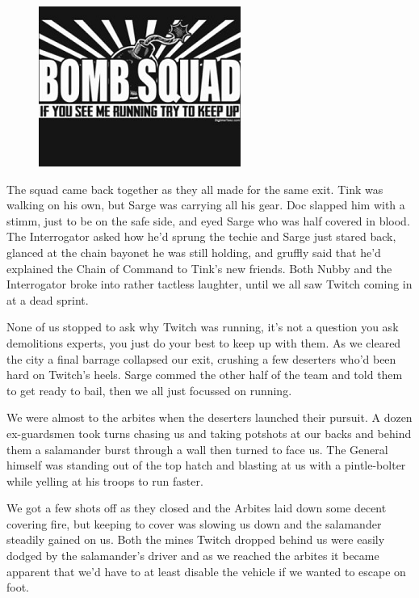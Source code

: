 \begin{figure}
	\begin{center}
		\includegraphics[width=\figwidth]{pics/9/33.png}
	\end{center}
\end{figure}
The squad came back together as they all made for the same exit. 
Tink was walking on his own, but Sarge was carrying all his gear. 
Doc slapped him with a stimm, just to be on the safe side, and eyed Sarge who was half covered in blood. 
The Interrogator asked how he'd sprung the techie and Sarge just stared back, glanced at the chain bayonet he was still holding, and gruffly said that he'd explained the Chain of Command to Tink's new friends. 
Both Nubby and the Interrogator broke into rather tactless laughter, until we all saw Twitch coming in at a dead sprint.

None of us stopped to ask why Twitch was running, it's not a question you ask demolitions experts, you just do your best to keep up with them. 
As we cleared the city a final barrage collapsed our exit, crushing a few deserters who'd been hard on Twitch's heels. 
Sarge commed the other half of the team and told them to get ready to bail, then we all just focussed on running.

We were almost to the arbites when the deserters launched their pursuit. 
A dozen ex-guardsmen took turns chasing us and taking potshots at our backs and behind them a salamander burst through a wall then turned to face us. 
The General himself was standing out of the top hatch and blasting at us with a pintle-bolter while yelling at his troops to run faster.

We got a few shots off as they closed and the Arbites laid down some decent covering fire, but keeping to cover was slowing us down and the salamander steadily gained on us. 
Both the mines Twitch dropped behind us were easily dodged by the salamander's driver and as we reached the arbites it became apparent that we'd have to at least disable the vehicle if we wanted to escape on foot.

